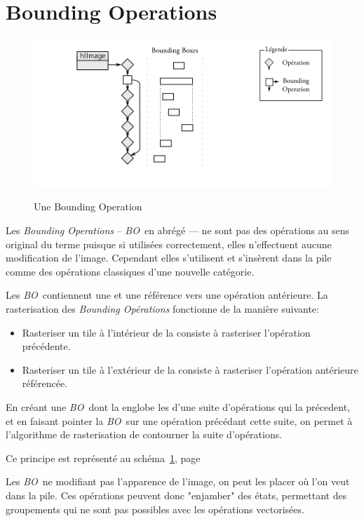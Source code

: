 	\section{Bounding Operations}
\newcommand{\BO}{\emph{BO}~}
		\begin{figure}[ht]
			\centering
			\includegraphics[width=\textwidth]{images/bo} 
			\label{fig:bo}
			\caption{Une Bounding Operation}
		\end{figure}
		Les \emph{Bounding Operations} -- \BO en abrégé --- ne sont pas des opérations au sens original du terme puisque si utilisées
		correctement, elles n'effectuent aucune modification de l'image. Cependant elles s'utilisent et s'insèrent
		dans la pile comme des opérations classiques d'une nouvelle catégorie. 
		
		Les \BO contiennent une \BB et une référence vers une opération antérieure.
		La rasterisation des \emph{Bounding Opérations} fonctionne de la manière suivante:
		\begin{itemize}
			\item Rasteriser un tile à l'intérieur de la \BB consiste à rasteriser l'opération précédente.
			\item Rasteriser un tile à l'extérieur de la \BB consiste à rasteriser l'opération antérieure référencée.
		\end{itemize}

		En créant une \BO dont la \BB englobe les \BB d'une suite
		d'opérations qui la précedent, et en faisant pointer la \BO sur une opération précédant 
		cette suite, on permet à l'algorithme de rasterisation de contourner la suite d'opérations.
		
		Ce principe est représenté au schéma~\ref{fig:bo}, page~\pageref{fig:bo}

		Les \BO ne modifiant pas l'apparence de l'image, on peut les placer où l'on veut dans la pile. Ces 
		opérations peuvent donc "enjamber" des états, permettant des groupements qui ne sont pas possibles avec les opérations
		vectorisées.

